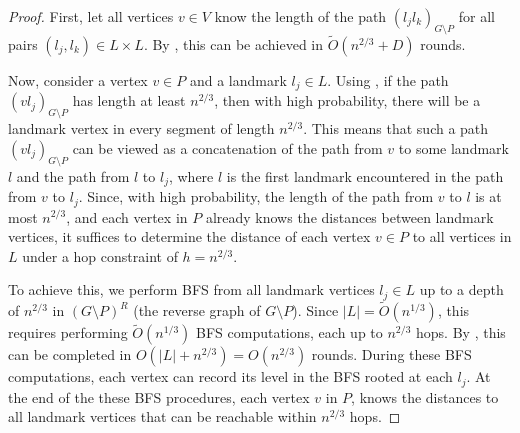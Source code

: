 \begin{proof}
First, let all vertices $v \in V$ know the length of the path $(l_j l_k)_{G \setminus P}$ for all pairs $(l_j, l_k) \in L \times L$. By , this can be achieved in $\widetilde{O}(n^{2/3} + D)$ rounds. 

Now, consider a vertex $v \in P$ and a landmark $l_j \in L$. Using , if the path $(v l_j)_{G \setminus P}$ has length at least $n^{2/3}$, then with high probability, there will be a landmark vertex in every segment of length $n^{2/3}$. This means that such a path $(v l_j)_{G \setminus P}$ can be viewed as a concatenation of the path from $v$ to some landmark $l$ and the path from $l$ to $l_j$, where $l$ is the first landmark encountered in the path from $v$ to $l_j$. Since, with high probability, the length of the path from $v$ to $l$ is at most $n^{2/3}$, and each vertex in $P$ already knows the distances between landmark vertices, it suffices to determine the distance of each vertex $v \in P$ to all vertices in $L$ under a hop constraint of $h=n^{2/3}$. 

To achieve this, we perform BFS from all landmark vertices $l_j \in L$ up to a depth of $n^{2/3}$ in $(G \setminus P)^R$ (the reverse graph of $G \setminus P$). Since $|L| = \widetilde{O}(n^{1/3})$, this requires performing $\widetilde{O}(n^{1/3})$ BFS computations, each up to $n^{2/3}$ hops. By , this can be completed in $O(|L| + n^{2/3}) = {O}(n^{2/3})$ rounds. During these BFS computations, each vertex can record its level in the BFS rooted at each $l_j$. At the end of the these BFS procedures, each vertex $v$ in $P$, knows the distances to all landmark vertices that can be reachable within $n^{2/3}$ hops.
\end{proof}

